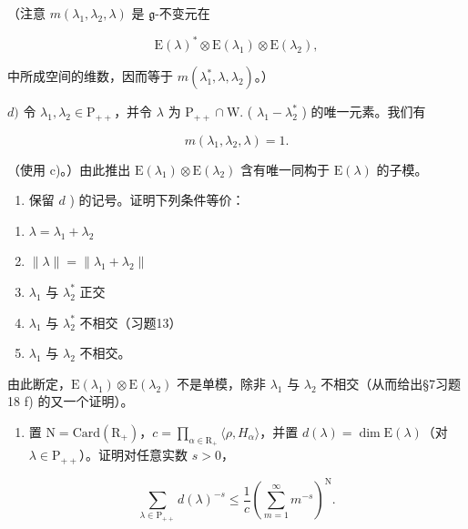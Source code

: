 （注意 \(m(\lambda_1,\lambda_2,\lambda)\) 是 \(\mathfrak{g}\)-不变元在

\[
\mathrm{E} (\lambda) ^ {*} \otimes \mathrm{E} (\lambda_ {1}) \otimes \mathrm{E} (\lambda_ {2}),
\]

中所成空间的维数，因而等于 \(m(\lambda_1^*, \lambda, \lambda_2)\)。）

\(d)\) 令 \(\lambda_1, \lambda_2 \in \mathrm{P}_{++}\)，并令 \(\lambda\) 为 \(\mathrm{P}_{++} \cap \mathrm{W}.\) ( \(\lambda_1 - \lambda_2^*\) ) 的唯一元素。我们有

\[
m (\lambda_ {1}, \lambda_ {2}, \lambda) = 1.
\]

（使用 c)。）由此推出 \(\mathrm{E}(\lambda_1) \otimes \mathrm{E}(\lambda_2)\) 含有唯一同构于 \(\mathrm{E}(\lambda)\) 的子模。

\begin{enumerate}
\def\labelenumi{\alph{enumi})}
\setcounter{enumi}{4}
\tightlist
\item
  保留 \(d\) ) 的记号。证明下列条件等价：
\end{enumerate}

\begin{enumerate}
\def\labelenumi{(\roman{enumi})}
\item
  \(\lambda = \lambda_{1} + \lambda_{2}\)
\item
  \(\| \lambda \| = \| \lambda_1 + \lambda_2 \|\)
\item
  \(\lambda_{1}\) 与 \(\lambda_2^*\) 正交
\item
  \(\lambda_{1}\) 与 \(\lambda_2^*\) 不相交（习题13）
\item
  \(\lambda_{1}\) 与 \(\lambda_{2}\) 不相交。
\end{enumerate}

由此断定，\(\mathrm{E}(\lambda_{1})\otimes\mathrm{E}(\lambda_{2})\) 不是单模，除非 \(\lambda_{1}\) 与 \(\lambda_{2}\) 不相交（从而给出§7习题18 f) 的又一个证明）。

\begin{enumerate}
\def\labelenumi{\arabic{enumi})}
\setcounter{enumi}{14}
\tightlist
\item
  置 \(\mathrm{N} = \mathrm{Card}(\mathrm{R}_{+})\)，\(c = \prod_{\alpha \in \mathrm{R}_{+}} \langle \rho, H_{\alpha} \rangle\)，并置 \(d(\lambda) = \dim \mathrm{E}(\lambda)\)（对 \(\lambda \in \mathrm{P}_{++}\)）。证明对任意实数 \(s > 0\)，
\end{enumerate}

\[
\sum_ {\lambda \in \mathrm{P} _ {+ +}} d (\lambda) ^ {- s} \leq \frac {1}{c} \left(\sum_ {m = 1} ^ {\infty} m ^ {- s}\right) ^ {\mathrm{N}}.
\]

